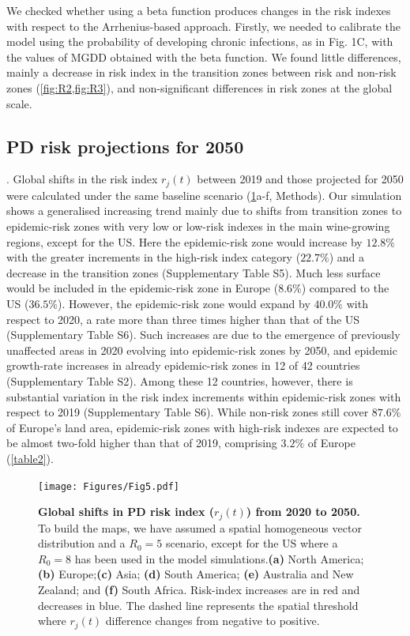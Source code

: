     We checked whether using a beta function produces changes in the risk
    indexes
    with respect to the Arrhenius-based approach. Firstly, we needed to
    calibrate
    the model using the probability of developing chronic infections, as in
    Fig.
    1C, with the values of MGDD obtained with the beta function. We found
    little
    differences, mainly a decrease in risk index in the transition zones
    between
    risk and non-risk zones (\cref{fig:R2,fig:R3}), and non-significant
    differences in risk zones at the global scale.

    \subsection{PD risk projections for 2050}. Global shifts in the risk index
$r_j(t)$ between 2019 and those projected for 2050 were calculated under the
    same baseline scenario (\cref{fig5}a-f, Methods). Our simulation shows a
    generalised increasing trend mainly due to shifts from transition zones to
    epidemic-risk zones with very low or low-risk indexes in the main
    wine-growing
    regions, except for the US. Here the epidemic-risk zone would increase by
$12.8\%$ with the greater increments in the high-risk index category ($22.7\%$)
    and a decrease in the transition zones (Supplementary Table S5). Much less
    surface would be included in the epidemic-risk zone in Europe ($8.6\%$)
    compared to the US ($36.5\%$). However, the epidemic-risk zone would expand
    by
$40.0\%$ with respect to 2020, a rate more than three times higher than that of
    the US (Supplementary Table S6). Such increases are due to the emergence of
    previously unaffected areas in 2020 evolving into epidemic-risk zones by
    2050,
    and epidemic growth-rate increases in already epidemic-risk zones in 12 of
    42
    countries (Supplementary Table S2). Among these 12 countries, however,
    there is
    substantial variation in the risk index increments within epidemic-risk
    zones
    with respect to 2019 (Supplementary Table S6). While non-risk zones still
    cover
$87.6\%$ of Europe's land area, epidemic-risk zones with high-risk indexes are
    expected to be almost two-fold higher than that of 2019, comprising $3.2\%$
    of
    Europe (\cref{table2}).

    \begin{figure}[b!]
        \centering
        \texttt{[image: Figures/Fig5.pdf]}
        \caption{\textbf{Global shifts in PD risk index ($r_j(t)$) from 2020 to
                2050.} To build the maps, we have assumed a spatial homogeneous
            vector
            distribution and a $R_0=5$ scenario, except for the US where a
            $R_0=8$ has been
            used in the model simulations.\textbf{(a)} North
            America;\textbf{(b)}
            Europe;\textbf{(c)} Asia; \textbf{(d)} South America; \textbf{(e)}
            Australia
            and New Zealand; and \textbf{(f)} South Africa. Risk-index
            increases are in red
            and decreases in blue. The dashed line represents the spatial
            threshold where
            $r_j(t)$ difference changes from negative to positive.}
        \label{fig5}
    \end{figure}

